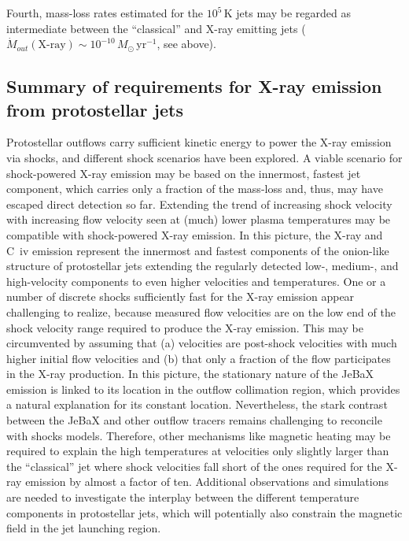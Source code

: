 Fourth, mass-loss rates estimated for the $10^5$\,K jets \citep[$\sim10^{-9}\,M_\odot$\,yr$^{-1}$,][]{Schneider_2013a} may be regarded as intermediate between the ``classical'' \citep[$\sim10^{-8}\,M_\odot$\,yr$^{-1}$, e.g., ][]{Bacciotti_2000} and X-ray emitting jets ($\dot{M}_{out}(\textrm{X-ray})\sim10^{-10}\,M_\odot$\,yr$^{-1}$, see above). 

\subsection{Summary of requirements for X-ray emission from protostellar jets}
Protostellar outflows carry sufficient kinetic energy to power the X-ray emission via shocks, and different shock scenarios have been explored. A viable scenario for shock-powered X-ray emission may be based on the innermost, fastest jet component, which carries only a fraction of the mass-loss and, thus, may have escaped direct detection so far. Extending the trend of increasing shock velocity with increasing flow velocity seen at (much) lower plasma temperatures may be compatible with shock-powered X-ray emission. In this picture, the X-ray and C~{\sc iv} emission represent the innermost and fastest components of the onion-like structure of protostellar jets extending the regularly detected low-, medium-, and high-velocity components to even higher velocities and temperatures. One or a number of discrete shocks sufficiently fast for the X-ray emission appear challenging to realize, because measured flow velocities are on the low end of the shock velocity range required to produce the X-ray emission. This  may be circumvented by assuming that (a) velocities are post-shock velocities with much higher initial flow velocities and (b) that only a fraction of the flow participates in the X-ray production. In this picture, the stationary nature of the JeBaX emission is linked to its location in the outflow collimation region, which provides a natural explanation for its constant location. Nevertheless, the stark contrast between the JeBaX and other outflow tracers remains challenging to reconcile with shocks models. Therefore, other mechanisms like magnetic heating may be required to explain the high temperatures at velocities only slightly larger than the ``classical'' jet where shock velocities fall short of the ones required for the X-ray emission by almost a factor of ten. Additional observations and simulations are needed to investigate the interplay between the different temperature components in protostellar jets, which will potentially also constrain the magnetic field in the jet launching region.


